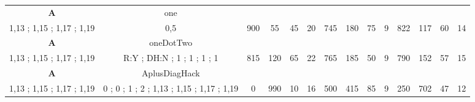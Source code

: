 \begin{table}[]
{\begin{tabular}{|c|c|c|c|c|c|c|c|c|c|c|c|c|c|}
\cellcolor{blue!15}\textbf{A} & one& {\color[HTML]{00009B} } & {\color[HTML]{9A0000} } & {\color[HTML]{009901} } &  & {\color[HTML]{00009B} } & {\color[HTML]{9A0000} } & {\color[HTML]{009901} } &  & {\color[HTML]{00009B} } & {\color[HTML]{9A0000} } & {\color[HTML]{009901} } &  \\ 
\cellcolor{ blue!15}1,13 ; 1,15 ; 1,17 ; 1,19 & 0,5 & \multirow{-2}{*}{{\color[HTML]{00009B} 900}} & \multirow{-2}{*}{{\color[HTML]{9A0000} 55}} & \multirow{-2}{*}{{\color[HTML]{009901} 45}} & \multirow{-2}{*}{20} & \multirow{-2}{*}{{\color[HTML]{00009B} 745}} & \multirow{-2}{*}{{\color[HTML]{9A0000} 180}} & \multirow{-2}{*}{{\color[HTML]{009901} 75}} & \multirow{-2}{*}{9} & \multirow{-2}{*}{{\color[HTML]{00009B} 822}} & \multirow{-2}{*}{{\color[HTML]{9A0000} 117}} & \multirow{-2}{*}{{\color[HTML]{009901} 60}} & \multirow{-2}{*}{14} \\ \hline

\cellcolor{blue!15}\textbf{A} & oneDotTwo& {\color[HTML]{00009B} } & {\color[HTML]{9A0000} } & {\color[HTML]{009901} } &  & {\color[HTML]{00009B} } & {\color[HTML]{9A0000} } & {\color[HTML]{009901} } &  & {\color[HTML]{00009B} } & {\color[HTML]{9A0000} } & {\color[HTML]{009901} } &  \\ 
\cellcolor{ blue!15}1,13 ; 1,15 ; 1,17 ; 1,19 & R:Y ; DH:N ; 1 ; 1 ; 1 ; 1 & \multirow{-2}{*}{{\color[HTML]{00009B} 815}} & \multirow{-2}{*}{{\color[HTML]{9A0000} 120}} & \multirow{-2}{*}{{\color[HTML]{009901} 65}} & \multirow{-2}{*}{22} & \multirow{-2}{*}{{\color[HTML]{00009B} 765}} & \multirow{-2}{*}{{\color[HTML]{9A0000} 185}} & \multirow{-2}{*}{{\color[HTML]{009901} 50}} & \multirow{-2}{*}{9} & \multirow{-2}{*}{{\color[HTML]{00009B} 790}} & \multirow{-2}{*}{{\color[HTML]{9A0000} 152}} & \multirow{-2}{*}{{\color[HTML]{009901} 57}} & \multirow{-2}{*}{15} \\ \hline

\cellcolor{blue!15}\textbf{A} & AplusDiagHack& {\color[HTML]{00009B} } & {\color[HTML]{9A0000} } & {\color[HTML]{009901} } &  & {\color[HTML]{00009B} } & {\color[HTML]{9A0000} } & {\color[HTML]{009901} } &  & {\color[HTML]{00009B} } & {\color[HTML]{9A0000} } & {\color[HTML]{009901} } &  \\ 
\cellcolor{ blue!15}1,13 ; 1,15 ; 1,17 ; 1,19 & 0 ; 0 ; 1 ; 2 ; 1,13 ; 1,15 ; 1,17 ; 1,19 & \multirow{-2}{*}{{\color[HTML]{00009B} 0}} & \multirow{-2}{*}{{\color[HTML]{9A0000} 990}} & \multirow{-2}{*}{{\color[HTML]{009901} 10}} & \multirow{-2}{*}{16} & \multirow{-2}{*}{{\color[HTML]{00009B} 500}} & \multirow{-2}{*}{{\color[HTML]{9A0000} 415}} & \multirow{-2}{*}{{\color[HTML]{009901} 85}} & \multirow{-2}{*}{9} & \multirow{-2}{*}{{\color[HTML]{00009B} 250}} & \multirow{-2}{*}{{\color[HTML]{9A0000} 702}} & \multirow{-2}{*}{{\color[HTML]{009901} 47}} & \multirow{-2}{*}{12} \\ \hline


\end{tabular}}
\end{table}

